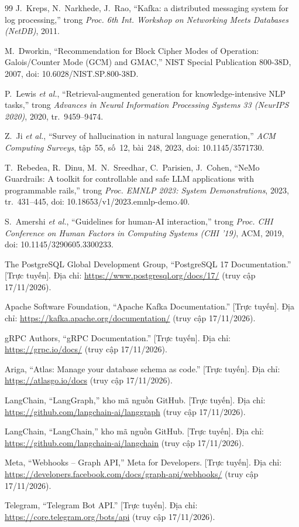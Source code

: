 \begin{thebibliography}{99}
J.~Kreps, N.~Narkhede, J.~Rao, ``Kafka: a distributed messaging system for log processing,'' trong \emph{Proc. 6th Int. Workshop on Networking Meets Databases (NetDB)}, 2011.

M.~Dworkin, ``Recommendation for Block Cipher Modes of Operation: Galois/Counter Mode (GCM) and GMAC,'' NIST Special Publication 800-38D, 2007, doi: 10.6028/NIST.SP.800-38D.

P.~Lewis \emph{et al.}, ``Retrieval-augmented generation for knowledge-intensive NLP tasks,'' trong \emph{Advances in Neural Information Processing Systems 33 (NeurIPS 2020)}, 2020, tr.~9459--9474.

Z.~Ji \emph{et al.}, ``Survey of hallucination in natural language generation,'' \emph{ACM Computing Surveys}, tập~55, số~12, bài~248, 2023, doi: 10.1145/3571730.

T.~Rebedea, R.~Dinu, M.~N.~Sreedhar, C.~Parisien, J.~Cohen, ``NeMo Guardrails: A toolkit for controllable and safe LLM applications with programmable rails,'' trong \emph{Proc. EMNLP 2023: System Demonstrations}, 2023, tr.~431--445, doi: 10.18653/v1/2023.emnlp-demo.40.

S.~Amershi \emph{et al.}, ``Guidelines for human-AI interaction,'' trong \emph{Proc. CHI Conference on Human Factors in Computing Systems (CHI '19)}, ACM, 2019, doi: 10.1145/3290605.3300233.

The PostgreSQL Global Development Group, ``PostgreSQL 17 Documentation.'' [Trực tuyến]. Địa chỉ: \url{https://www.postgresql.org/docs/17/} (truy cập 17/11/2026).

Apache Software Foundation, ``Apache Kafka Documentation.'' [Trực tuyến]. Địa chỉ: \url{https://kafka.apache.org/documentation/} (truy cập 17/11/2026).

gRPC Authors, ``gRPC Documentation.'' [Trực tuyến]. Địa chỉ: \url{https://grpc.io/docs/} (truy cập 17/11/2026).

Ariga, ``Atlas: Manage your database schema as code.'' [Trực tuyến]. Địa chỉ: \url{https://atlasgo.io/docs} (truy cập 17/11/2026).

LangChain, ``LangGraph,'' kho mã nguồn GitHub. [Trực tuyến]. Địa chỉ: \url{https://github.com/langchain-ai/langgraph} (truy cập 17/11/2026).

LangChain, ``LangChain,'' kho mã nguồn GitHub. [Trực tuyến]. Địa chỉ: \url{https://github.com/langchain-ai/langchain} (truy cập 17/11/2026).

Meta, ``Webhooks -- Graph API,'' Meta for Developers. [Trực tuyến]. Địa chỉ: \url{https://developers.facebook.com/docs/graph-api/webhooks/} (truy cập 17/11/2026).

Telegram, ``Telegram Bot API.'' [Trực tuyến]. Địa chỉ: \url{https://core.telegram.org/bots/api} (truy cập 17/11/2026).

\end{thebibliography}
